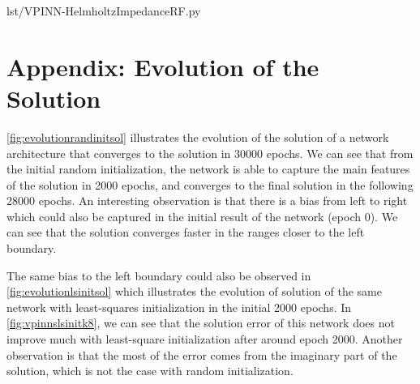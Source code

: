 
{lst/VPINN-HelmholtzImpedanceRF.py}

\section{Appendix: Evolution of the Solution}
\label{app:evolutions}
\autoref{fig:evolutionrandinitsol} illustrates the evolution of the solution of a network architecture that converges to the solution in 30000 epochs. We can see that from the initial random initialization, the network is able to capture the main features of the solution in 2000 epochs, and converges to the final solution in the following 28000 epochs. An interesting observation is that there is a bias from left to right which could also be captured in the initial result of the network (epoch 0). We can see that the solution converges faster in the ranges closer to the left boundary.

The same bias to the left boundary could also be observed in \autoref{fig:evolutionlsinitsol} which illustrates the evolution of solution of the same network with least-squares initialization in the initial 2000 epochs. In \autoref{fig:vpinnslsinitk8}, we can see that the solution error of this network does not improve much with least-square initialization after around epoch 2000. Another observation is that the most of the error comes from the imaginary part of the solution, which is not the case with random initialization.

